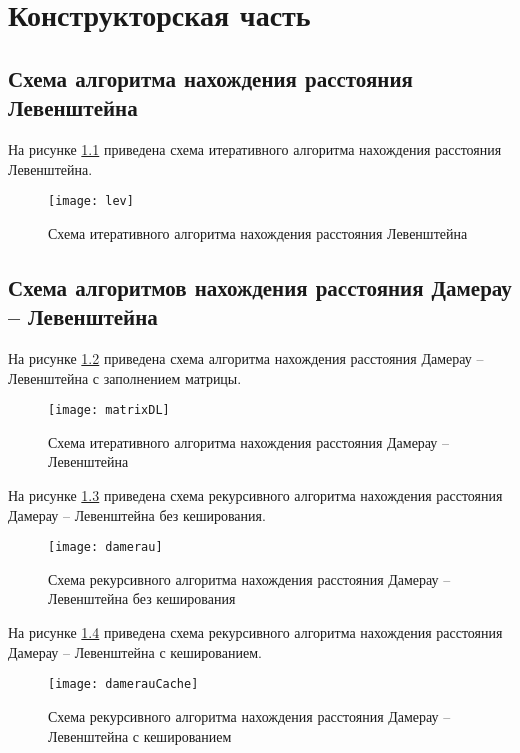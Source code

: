 \chapter{Конструкторская часть}

\section{Схема алгоритма нахождения расстояния Левенштейна}

На рисунке \ref{img:lev} приведена схема итеративного алгоритма нахождения расстояния Левенштейна.
\begin{figure}[h]
	\centering
	\texttt{[image: lev]}
	\caption{Схема итеративного алгоритма нахождения расстояния Левенштейна}
	\label{img:lev}
\end{figure}

\section{Схема алгоритмов нахождения расстояния Дамерау -- Левенштейна}

На рисунке \ref{img:damerau} приведена схема алгоритма нахождения расстояния Дамерау -- Левенштейна с заполнением матрицы.
\begin{figure}[h]
	\centering
	\texttt{[image: matrixDL]}
	\caption{Схема итеративного алгоритма нахождения расстояния Дамерау -- Левенштейна}
	\label{img:damerau}
\end{figure}
\newpage
На рисунке \ref{img:recursive} приведена схема рекурсивного алгоритма нахождения расстояния Дамерау -- Левенштейна без кеширования. 
\begin{figure}[h]
	\centering
	\texttt{[image: damerau]}
	\caption{Схема рекурсивного алгоритма нахождения расстояния Дамерау -- Левенштейна без кеширования}
	\label{img:recursive}
\end{figure}
\newpage
На рисунке \ref{img:recursive_with_mem} приведена схема рекурсивного алгоритма нахождения расстояния Дамерау -- Левенштейна с кешированием.
\begin{figure}[h]
	\centering
	\texttt{[image: damerauCache]}
	\caption{Схема рекурсивного алгоритма нахождения расстояния Дамерау -- Левенштейна с кешированием}
	\label{img:recursive_with_mem}
\end{figure}

